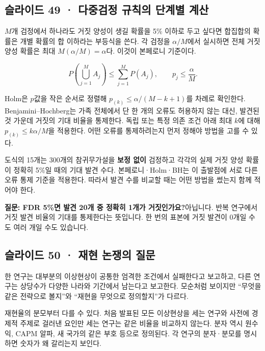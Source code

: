 \documentclass[11pt,a4paper]{article}
\begin{document}
\subsection{슬라이드 49 · 다중검정 규칙의 단계별 계산}
$M$개 검정에서 하나라도 거짓 양성이 생길 확률을 5\% 이하로 두고 싶다면 합집합의 확률은 개별 확률의 합 이하라는 부등식을 쓴다. 각 검정을 $\alpha/M$에서 실시하면 전체 거짓 양성 확률은 최대 $M(\alpha/M)=\alpha$다. 이것이 본페로니 기준이다.\par

\[
P\!\left(\bigcup_{j=1}^{M}A_j\right)
\le\sum_{j=1}^{M}P(A_j),\qquad
p_j\le\frac{\alpha}{M}.
\]

Holm은 $p$값을 작은 순서로 정렬해 $p_{(k)}\le\alpha/(M-k+1)$를 차례로 확인한다. Benjamini–Hochberg는 가족 전체에서 단 한 개의 오류도 허용하지 않는 대신, 발견된 것 가운데 거짓의 기대 비율을 통제한다. 독립 또는 특정 의존 조건 아래 최대 $k$에 대해 $p_{(k)}\le k\alpha/M$을 적용한다. 어떤 오류를 통제하려는지 먼저 정해야 방법을 고를 수 있다.\par

도식의 15개는 300개의 참귀무가설을 \textbf{보정 없이} 검정하고 각각의 실제 거짓 양성 확률이 정확히 5\%일 때의 기대 발견 수다. 본페로니·Holm·BH는 이 출발점에 서로 다른 오류 통제 기준을 적용한다. 따라서 발견 수를 비교할 때는 어떤 방법을 썼는지 함께 적어야 한다.\par

\begin{samepage}\par\medskip\noindent\textbf{질문: FDR 5\%면 발견 20개 중 정확히 1개가 거짓인가요?}\quad 아닙니다. 반복 연구에서 거짓 발견 비율의 기대를 통제한다는 뜻입니다. 한 번의 표본에 거짓 발견이 0개일 수도 여러 개일 수도 있습니다.\par\end{samepage}

\subsection{슬라이드 50 · 재현 논쟁의 질문}
한 연구는 대부분의 이상현상이 공통한 엄격한 조건에서 실패한다고 보고하고, 다른 연구는 상당수가 다양한 나라와 기간에서 남는다고 보고한다. 모순처럼 보이지만 “무엇을 같은 전략으로 볼지”와 “재현을 무엇으로 정의할지”가 다르다.\par

재현율의 분모부터 다를 수 있다. 처음 발표된 모든 이상현상을 세는 연구와 사전에 경제적 주제로 걸러낸 요인만 세는 연구는 같은 비율을 비교하지 않는다. 분자 역시 원수익, CAPM 알파, 새 국가의 같은 부호 등으로 정의된다. 각 연구의 분자·분모를 명시하면 숫자가 왜 갈리는지 보인다.\par
\end{document}
